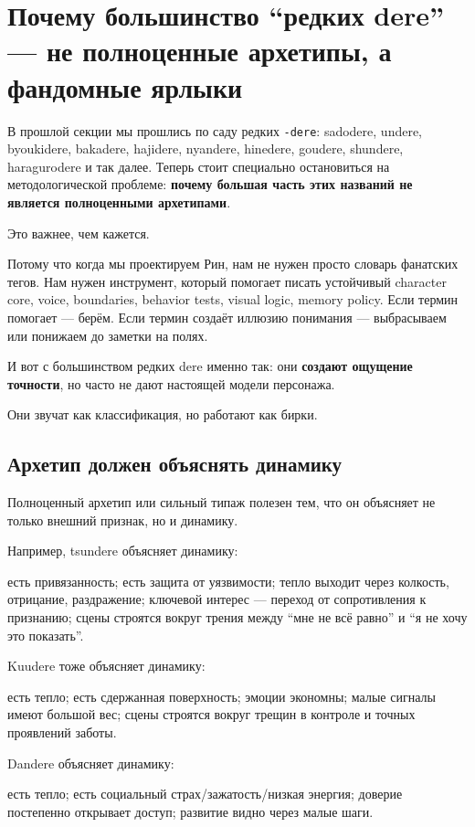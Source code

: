 \section{Почему большинство “редких dere” — не полноценные архетипы, а фандомные ярлыки}

В прошлой секции мы прошлись по саду редких \texttt{-dere}: sadodere,
undere, byoukidere, bakadere, hajidere, nyandere, hinedere, goudere,
shundere, haragurodere и так далее. Теперь стоит специально остановиться
на методологической проблеме: \textbf{почему большая часть этих названий
не является полноценными архетипами}.

Это важнее, чем кажется.

Потому что когда мы проектируем Рин, нам не нужен просто словарь
фанатских тегов. Нам нужен инструмент, который помогает писать
устойчивый character core, voice, boundaries, behavior tests, visual
logic, memory policy. Если термин помогает --- берём. Если термин
создаёт иллюзию понимания --- выбрасываем или понижаем до заметки на
полях.

И вот с большинством редких dere именно так: они \textbf{создают
ощущение точности}, но часто не дают настоящей модели персонажа.

Они звучат как классификация, но работают как бирки.

\subsection*{Архетип должен объяснять динамику}

Полноценный архетип или сильный типаж полезен тем, что он объясняет не
только внешний признак, но и динамику.

Например, tsundere объясняет динамику:

есть привязанность; есть защита от уязвимости; тепло выходит через
колкость, отрицание, раздражение; ключевой интерес --- переход от
сопротивления к признанию; сцены строятся вокруг трения между ``мне не
всё равно'' и ``я не хочу это показать''.

Kuudere тоже объясняет динамику:

есть тепло; есть сдержанная поверхность; эмоции экономны; малые сигналы
имеют большой вес; сцены строятся вокруг трещин в контроле и точных
проявлений заботы.

Dandere объясняет динамику:

есть тепло; есть социальный страх/\hspace{0pt}зажатость/\hspace{0pt}низкая энергия; доверие
постепенно открывает доступ; развитие видно через малые шаги.


